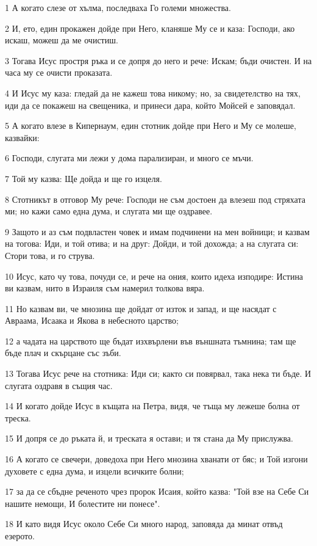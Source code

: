 \par 1 А когато слезе от хълма, последваха Го големи множества.
\par 2 И, ето, един прокажен дойде при Него, кланяше Му се и каза: Господи, ако искаш, можеш да ме очистиш.
\par 3 Тогава Исус простря ръка и се допря до него и рече: Искам; бъди очистен. И на часа му се очисти проказата.
\par 4 И Исус му каза: гледай да не кажеш това никому; но, за свидетелство на тях, иди да се покажеш на свещеника, и принеси дара, който Мойсей е заповядал.
\par 5 А когато влезе в Кипернаум, един стотник дойде при Него и Му се молеше, казвайки:
\par 6 Господи, слугата ми лежи у дома парализиран, и много се мъчи.
\par 7 Той му казва: Ще дойда и ще го изцеля.
\par 8 Стотникът в отговор Му рече: Господи не съм достоен да влезеш под стряхата ми; но кажи само една дума, и слугата ми ще оздравее.
\par 9 Защото и аз съм подвластен човек и имам подчинени на мен войници; и казвам на тогова: Иди, и той отива; и на друг: Дойди, и той дохожда; а на слугата си: Стори това, и го струва.
\par 10 Исус, като чу това, почуди се, и рече на ония, които идеха изподире: Истина ви казвам, нито в Израиля съм намерил толкова вяра.
\par 11 Но казвам ви, че мнозина ще дойдат от изток и запад, и ще насядат с Авраама, Исаака и Якова в небесното царство;
\par 12 а чадата на царството ще бъдат изхвърлени във външната тъмнина; там ще бъде плач и скърцане със зъби.
\par 13 Тогава Исус рече на стотника: Иди си; както си повярвал, така нека ти бъде. И слугата оздравя в същия час.
\par 14 И когато дойде Исус в къщата на Петра, видя, че тъща му лежеше болна от треска.
\par 15 И допря се до ръката й, и треската я остави; и тя стана да Му прислужва.
\par 16 А когато се свечери, доведоха при Него мнозина хванати от бяс; и Той изгони духовете с една дума, и изцели всичките болни;
\par 17 за да се сбъдне реченото чрез пророк Исаия, който казва: "Той взе на Себе Си нашите немощи, И болестите ни понесе".
\par 18 И като видя Исус около Себе Си много народ, заповяда да минат отвъд езерото.
